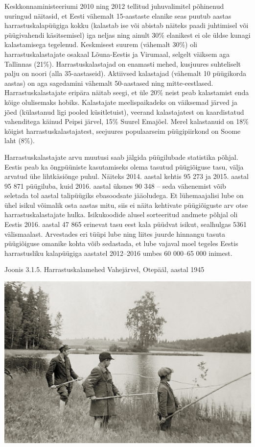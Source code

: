 \documentclass[estonian,]{article}
\begin{document}
Keskkonnaministeeriumi 2010 ning 2012 tellitud juhuvalimitel põhinenud uuringud näitasid, et Eesti vähemalt 15-aastaste elanike seas puutub aastas harrastuskalapüügiga kokku (kalastab ise või abistab näiteks paadi juhtimisel või püügivahendi käsitsemisel) iga neljas ning ainult 30\% elanikest ei ole üldse kunagi kalastamisega tegelenud. Keskmisest suurem (vähemalt 30\%) oli harrastuskalastajate osakaal Lõuna-Eestis ja Virumaal, selgelt väiksem aga Tallinnas (21\%). Harrastuskalastajad on enamasti mehed, kusjuures suhteliselt palju on noori (alla 35-aastaseid). Aktiivsed kalastajad (vähemalt 10 püügikorda aastas) on aga sagedamini vähemalt 50-aastased ning mitte-eestlased. Harrastuskalastajate eripära näitab seegi, et üle 20\% neist peab kalastamist enda kõige olulisemaks hobiks. Kalastajate meelispaikadeks on väiksemad järved ja jõed (külastanud ligi pooled küsitletuist), veerand kalastajatest on kaardistatud vahenditega käinud Peipsi järvel, 15\% Suurel Emajõel. Merel kalastanuid on 18\% kõigist harrastuskalastajatest, seejuures populaarseim püügipiirkond on Soome laht (8\%).

Harrastuskalastajate arvu muutusi saab jälgida püügilubade statistika põhjal. Eestis peab ka õngpüüniste kasutamiseks olema tasutud püügiõiguse tasu, välja arvatud ühe lihtkäsiõnge puhul. Näiteks 2014. aastal kehtis 95 273 ja 2015. aastal 95 871 püügiluba, kuid 2016. aastal üksnes 90 348 -- seda vähenemist võib seletada tol aastal talipüügiks ebasoodsate jääoludega. Et lühemaajalisi lube on ühel isikul võimalik osta aastas mitu, siis ei näita kehtivate püügiõiguste arv otse harrastuskalastajate hulka. Isikukoodide alusel sorteeritud andmete põhjal oli Eestis 2016. aastal 47 865 erinevat tasu eest kala püüdvat isikut, sealhulgas 5361 välismaalast. Arvestades eri tüüpi lube ning liites juurde hinnangu tasuta püügiõiguse omanike kohta võib sedastada, et lube vajaval moel tegeles Eestis harrastusliku kalapüügiga aastatel 2012--2016 umbes 60 000--65 000 inimest.

{Joonis 3.1.5.} Harrastuskalamehed Vahejärvel, Otepääl, aastal 1945

\begin{center}\includegraphics[width=0.9\linewidth]{figures/3-chapter/fig315} \end{center}
\end{document}

